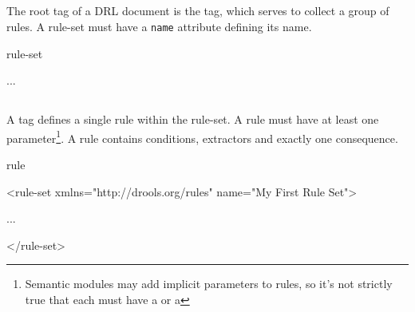 
\subsection{}

The root tag of a DRL document is the  tag, which
serves to collect a group of rules. A rule-set must have a
\texttt{name} attribute defining its name.

\begin{tagDesc}{rule-set}
\attrs
{}
\tags
{}
\end{tagDesc}

\begin{center}
\begin{minipage}{0.8\textwidth}
\begin{tagExample}
\color{black}{<rule-set xmlns="http://drools.org/rules"}
          \color{black}{name="My First Rule Set">}
    ...
\color{black}{</rule-set>}
\end{tagExample}
\end{minipage}
\end{center}


\subsection{}

A  tag defines a single rule within the rule-set.  A rule
must have at least one parameter\footnote{Semantic modules may add
implicit parameters to rules, so it's not strictly true that each
 must have a  or a }.
A rule contains conditions, extractors and exactly one consequence. 

\begin{tagDesc}{rule}
\attrs
\tags
\end{tagDesc}

\begin{center}
\begin{minipage}{0.8\textwidth}
\begin{tagExample}
<rule-set xmlns="http://drools.org/rules" 
          name="My First Rule Set">

    \color{black}{<rule name="My First Rule"}
          \color{black}{salience="10">}
        ...
    \color{black}{</rule>}

</rule-set>
\end{tagExample}
\end{minipage}
\end{center}


